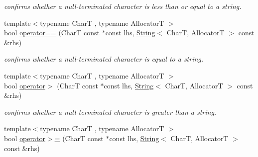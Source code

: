 \begin{DoxyCompactItemize}
\begin{DoxyCompactList}\small\item\em confirms whether a null-\/terminated character is less than or equal to a string. \end{DoxyCompactList}\item 
\hypertarget{namespacehryky_a96bfe0df0a09db56e7253330de4f2243}{{\footnotesize template$<$typename Char\-T , typename Allocator\-T $>$ }\\bool \hyperlink{namespacehryky_a96bfe0df0a09db56e7253330de4f2243}{operator==} (Char\-T const $\ast$const lhs, \hyperlink{classhryky_1_1_string}{String}$<$ Char\-T, Allocator\-T $>$ const \&rhs)}\label{namespacehryky_a96bfe0df0a09db56e7253330de4f2243}

\begin{DoxyCompactList}\small\item\em confirms whether a null-\/terminated character is equal to a string. \end{DoxyCompactList}\item 
\hypertarget{namespacehryky_af7f213d8e2d7f4c75ac2c93d7be56365}{{\footnotesize template$<$typename Char\-T , typename Allocator\-T $>$ }\\bool \hyperlink{namespacehryky_af7f213d8e2d7f4c75ac2c93d7be56365}{operator$>$} (Char\-T const $\ast$const lhs, \hyperlink{classhryky_1_1_string}{String}$<$ Char\-T, Allocator\-T $>$ const \&rhs)}\label{namespacehryky_af7f213d8e2d7f4c75ac2c93d7be56365}

\begin{DoxyCompactList}\small\item\em confirms whether a null-\/terminated character is greater than a string. \end{DoxyCompactList}\item 
\hypertarget{namespacehryky_acc487ba69503ce030df6f4b9db4cbe8b}{{\footnotesize template$<$typename Char\-T , typename Allocator\-T $>$ }\\bool \hyperlink{namespacehryky_acc487ba69503ce030df6f4b9db4cbe8b}{operator$>$=} (Char\-T const $\ast$const lhs, \hyperlink{classhryky_1_1_string}{String}$<$ Char\-T, Allocator\-T $>$ const \&rhs)}\label{namespacehryky_acc487ba69503ce030df6f4b9db4cbe8b}


\end{DoxyCompactItemize}
